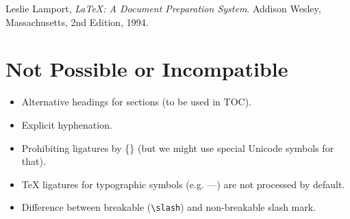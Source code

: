 \documentclass[10pt]{article}
\begin{document}
\begin{thebibliography}{9}

 Leslie Lamport, \emph{\LaTeX: A Document Preparation System}.
Addison Wesley, Massachusetts, 2nd Edition, 1994.

\end{thebibliography}

\hrulefill

\section{Not Possible or Incompatible}

\begin{itemize}

\item Alternative headings for sections (to be used in TOC).

\item Explicit hyphenation.

\item Prohibiting ligatures by \{\} (but we might use special Unicode symbols
for that).

\item \TeX{} ligatures for typographic symbols (e.g. ---) are not processed
by default.

\item Difference between breakable (\texttt{\textbackslash{}slash}) and
non-breakable slash mark.

\end{itemize}
\end{document}
